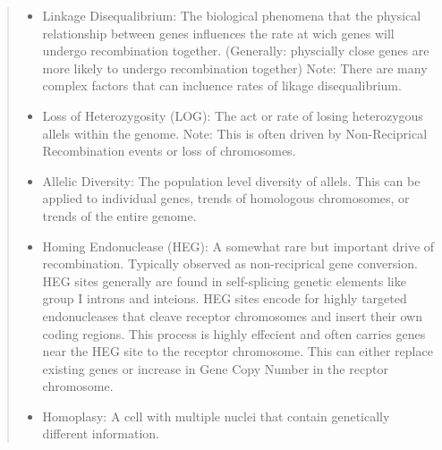 \documentclass{article}
\begin{document}
\begin{abstract}
\begin{itemize}
\begin{itemize}
                        \begin{itemize}
                            \item Donor Chromosome: The chromosome that donates genetic information.  Note: This chromosome remains unaltered
                            \item Receptor Chromosome: The chromosome that recieves genetic information. Note: This chromosome is altered
                        \end{itemize}
                    \item Gene-Conversion: A type of recombination where a single gene or group of genes not including the end of the chromosome undergoes recombination.  Note: This requires two double strand breaks in the chromosomes.
                    \item Tail Swap: A type of recombination where a gene or group of genes including one tail of the chromosomes undergoes recombination.  Note: This requires a single double strand break.
                \end{itemize}
            \item Linkage Disequalibrium: The biological phenomena that the physical relationship between genes influences the rate at wich genes will undergo recombination together.  (Generally: physcially close genes are more likely to undergo recombination together) Note: There are many complex factors that can incluence rates of likage disequalibrium.
            \item Loss of Heterozygosity (LOG):  The act or rate of losing heterozygous allels within the genome.  Note: This is often driven by Non-Reciprical Recombination events or loss of chromosomes.
            \item Allelic Diversity: The population level diversity of allels.  This can be applied to individual genes, trends of homologous chromosomes, or trends of the entire genome.
            \item Homing Endonuclease (HEG): A somewhat rare but important drive of recombination.  Typically observed as non-reciprical gene conversion.  HEG sites generally are found in self-splicing genetic elements like group I introns and inteions.  HEG sites encode for highly targeted endonucleases that cleave receptor chromosomes and insert their own coding regions.  This process is highly effecient and often carries genes near the HEG site to the receptor chromosome.  This can either replace existing genes or increase in Gene Copy Number in the recptor chromosome.
            \item Homoplasy: A cell with multiple nuclei that contain genetically different information.

\end{itemize}
\end{abstract}
\end{document}
